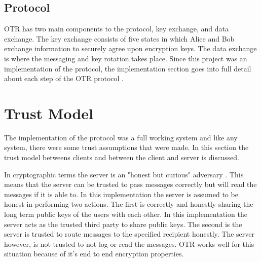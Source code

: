 \subsection{Protocol}


OTR has two main components to the protocol, key exchange, and data exchange. The key exchange consists of five states in which Alice and Bob exchange information to securely agree upon encryption keys. The data exchange is where the messaging and key rotation takes place.
Since this project was an implementation of the protocol, the implementation section goes into full detail about each step of the OTR protocol \cite{otr-protocol}.


\section{Trust Model}


The implementation of the protocol was a full working system and like any system, there were some trust assumptions that were made. In this section the trust model betweens clients and between the client and server is discussed. 


In cryptographic terms the server is an "honest but curious" adversary \cite{sjcl-paper}. This means that the server can be trusted to pass messages correctly but will read the messages if it is able to. In this implementation the server is assumed to be honest in performing two actions. The first is correctly and honestly sharing the long term public keys of the users with each other. In this implementation the server acts as the trusted third party to share public keys. The second is the server is trusted to route messages to the specified recipient honestly. The server however, is not trusted to not log or read the messages. OTR works well for this situation because of it's end to end encryption properties.

